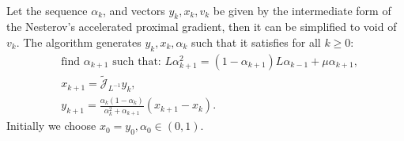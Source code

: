 \documentclass[12pt]{article}
\begin{document}
    \begin{theorem}
        \; \\
        Let the sequence $\alpha_k$, and vectors $y_k, x_k, v_k$ be given by the intermediate form of the Nesterov's accelerated proximal gradient, then it can be simplified to void of $v_k$. 
        The algorithm generates $y_k, x_k, \alpha_k$ such that it satisfies for all $k \ge 0$: 
        \begin{align*}
            & \text{find } \alpha_{k + 1} \text{ such that: }L \alpha_{k + 1}^2 = (1 - \alpha_{k + 1})L \alpha_{k - 1} + \mu \alpha_{k + 1}, 
            \\
            & x_{k + 1} = \widetilde {\mathcal J}_{L^{-1}} y_k, 
            \\
            & y_{k + 1} = \frac{\alpha_k(1 - \alpha_k)}{\alpha_k^2 + \alpha_{k + 1}}(x_{k + 1} - x_k). 
        \end{align*}
        Initially we choose $x_0 = y_0, \alpha_0 \in (0, 1)$. 
    \end{theorem}
\end{document}

